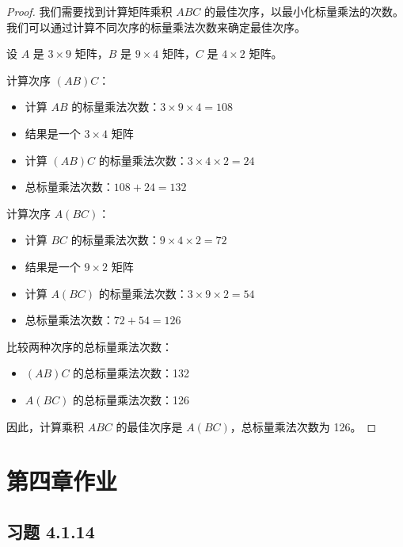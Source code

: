 \documentclass[UTF8]{report}
\theoremstyle{MyLineTheoremStyle} %
\theoremstyle{MyBlockTheoremStyle} %
\theoremstyle{MySubsubsectionStyle} %
\begin{document}
\begin{proof}
    我们需要找到计算矩阵乘积 \( ABC \) 的最佳次序，以最小化标量乘法的次数。我们可以通过计算不同次序的标量乘法次数来确定最佳次序。

    设 \( A \) 是 \( 3 \times 9 \) 矩阵，\( B \) 是 \( 9 \times 4 \) 矩阵，\( C \) 是 \( 4 \times 2 \) 矩阵。

    计算次序 \( (AB)C \)：
    \begin{itemize}
        \item 计算 \( AB \) 的标量乘法次数：\( 3 \times 9 \times 4 = 108 \)
        \item 结果是一个 \( 3 \times 4 \) 矩阵
        \item 计算 \( (AB)C \) 的标量乘法次数：\( 3 \times 4 \times 2 = 24 \)
        \item 总标量乘法次数：\( 108 + 24 = 132 \)
    \end{itemize}

    计算次序 \( A(BC) \)：
    \begin{itemize}
        \item 计算 \( BC \) 的标量乘法次数：\( 9 \times 4 \times 2 = 72 \)
        \item 结果是一个 \( 9 \times 2 \) 矩阵
        \item 计算 \( A(BC) \) 的标量乘法次数：\( 3 \times 9 \times 2 = 54 \)
        \item 总标量乘法次数：\( 72 + 54 = 126 \)
    \end{itemize}

    比较两种次序的总标量乘法次数：
    \begin{itemize}
        \item \( (AB)C \) 的总标量乘法次数：132
        \item \( A(BC) \) 的总标量乘法次数：126
    \end{itemize}

    因此，计算乘积 \( ABC \) 的最佳次序是 \( A(BC) \)，总标量乘法次数为 126。
\end{proof}







\chapter{第四章作业}

\section{习题 4.1.14}
\end{document}
